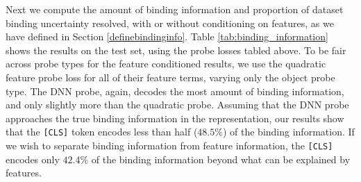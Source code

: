 \documentclass{article}
\theoremstyle{plain}
\theoremstyle{definition}
\theoremstyle{remark}
\begin{document}
\begin{table}[H]
\centering
\caption{\textbf{Comparison of quadratic object code probes with and without parameter reuse.} We report error reduction (ER) relative to the trivial majority-label baseline, which achieves $71.9\%$ accuracy for object codes. Numbers in parentheses denote the number of parameters relative to the linear probe.}
\label{tab:weight_sharing_ablation}
\end{table}

Next we compute the amount of binding information and proportion of dataset binding uncertainty resolved, with or without conditioning on features, as we have defined in Section \ref{definebindinginfo}. Table \ref{tab:binding_information} shows the results on the test set, using the probe losses tabled above. To be fair across probe types for the feature conditioned results, we use the quadratic feature probe loss for all of their feature terms, varying only the object probe type. The DNN probe, again, decodes the most amount of binding information, and only slightly more than the quadratic probe. Assuming that the DNN probe approaches the true binding information in the representation, our results show that the \texttt{[CLS]} token encodes less than half ($48.5\%$) of the binding information. If we wish to separate binding information from feature information, the \texttt{[CLS]} encodes only $42.4\%$ of the binding information beyond what can be explained by features.
\end{document}
